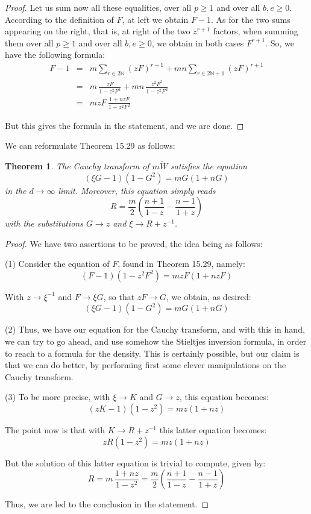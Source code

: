 \documentclass[12pt]{amsbook}
\newtheorem{theorem}{Theorem}[chapter]
\begin{document}
\begin{proof}
Let us sum now all these equalities, over all $p\geq 1$ and over all $b,e\geq 0$. According to the definition of $F$, at left we obtain $F-1$. As for the two sums appearing on the right, that is, at right of the two $z^{r+1}$ factors, when summing them over all $p\geq 1$ and over all $b,e\geq 0$, we obtain in both cases $F^{r+1}$. So, we have the following formula:
\begin{eqnarray*}
F-1
&=&m\sum_{r\in 2\mathbb N}(zF)^{r+1}+mn\sum_{r\in 2\mathbb N+1}(zF)^{r+1}\\
&=&m\,\frac{zF}{1-z^2F^2}+mn\,\frac{z^2F^2}{1-z^2F^2}\\
&=&mzF\,\frac{1+nzF}{1-z^2F^2}
\end{eqnarray*}

But this gives the formula in the statement, and we are done.
\end{proof}

We can reformulate Theorem 15.29 as follows:

\begin{theorem}
The Cauchy transform of $m\tilde{W}$ satisfies the equation
$$(\xi G-1)(1-G^2)=mG(1+nG)$$
in the $d\to\infty$ limit. Moreover, this equation simply reads
$$R=\frac{m}{2}\left(\frac{n+1}{1-z}-\frac{n-1}{1+z}\right)$$
with the substitutions $G\to z$ and $\xi\to R+z^{-1}$.
\end{theorem}

\begin{proof}
We have two assertions to be proved, the idea being as follows:

\medskip

(1) Consider the equation of $F$, found in Theorem 15.29, namely:
$$(F-1)(1-z^2F^2)=mzF(1+nzF)$$

With $z\to\xi^{-1}$ and $F\to\xi G$, so that $zF\to G$, we obtain, as desired:
$$(\xi G-1)(1-G^2)=mG(1+nG)$$

(2) Thus, we have our equation for the Cauchy transform, and with this in hand, we can try to go ahead, and use somehow the Stieltjes inversion formula, in order to reach to a formula for the density. This is certainly possible, but our claim is that we can do better, by performing first some clever manipulations on the Cauchy transform.

\medskip

(3) To be more precise, with $\xi \to K$ and $G\to z$, this equation becomes:
$$(zK-1)(1-z^2)=mz(1+nz)$$

The point now is that with $K\to R+z^{-1}$ this latter equation becomes:
$$zR(1-z^2)=mz(1+nz)$$

But the solution of this latter equation is trivial to compute, given by:
$$R=m\,\frac{1+nz}{1-z^2}=\frac{m}{2}\left(\frac{n+1}{1-z}-\frac{n-1}{1+z}\right)$$

Thus, we are led to the conclusion in the statement.
\end{proof}
\end{document}
